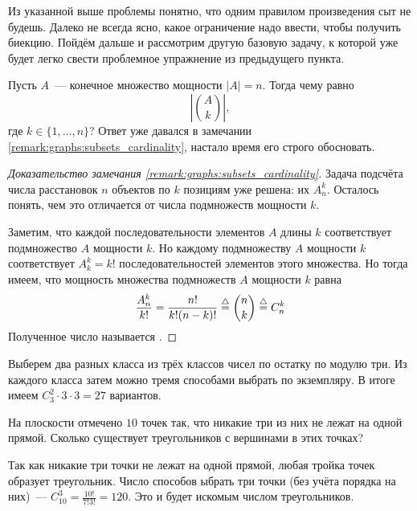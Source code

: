Из указанной выше проблемы понятно, что одним правилом произведения сыт не будешь.
Далеко не всегда ясно, какое ограничение надо ввести, чтобы получить биекцию.
Пойдём дальше и рассмотрим другую базовую задачу, к которой уже будет легко свести проблемное упражнение из предыдущего пункта.

Пусть $ A $~--- конечное множество мощности $ |A| = n $.
Тогда чему равно
\[
    \left| \binom{A}{k} \right|,
\]
где $ k \in \{1, \ldots, n\} $?
Ответ уже давался в замечании \ref{remark:graphs:subsets_cardinality}, настало время его строго обосновать.

\begin{proof}[Доказательство замечания \ref{remark:graphs:subsets_cardinality}]
    Задача подсчёта числа расстановок $ n $ объектов по $ k $ позициям уже решена:
    их $ A_n^k $.
    Осталось понять, чем это отличается от числа подмножеств мощности $ k $.

    Заметим, что каждой последовательности элементов $ A $ длины $ k $ соответствует подмножество $ A $ мощности $ k $.
    Но каждому подмножеству $ A $ мощности $ k $ соответствует $ A_k^k = k! $ последовательностей элементов этого множества.
    Но тогда имеем, что мощность множества подмножеств $ A $ мощности $ k $ равна
    \begin{equation}
        \label{eq:combinatorics:binomial}
        \frac{A_n^k}{k!} = \frac{n!}{k!(n-k)!} \overset{\triangle}{=} \binom{n}{k} \overset{\triangle}{=} C_n^k
    \end{equation}
    Полученное число называется .
\end{proof}

\vspace{\baselineskip}

\begin{Answer}
    \noindent
    Выберем два разных класса из трёх классов чисел по остатку по модулю три.
    Из каждого класса затем можно тремя способами выбрать по экземпляру.
    В итоге имеем $ C_3^2 \cdot 3 \cdot 3 = 27 $ вариантов.
\end{Answer}


\begin{Exercise}[counter=SecExercise, label={exercise:combinatorics:triangles}]
    \noindent
    На плоскости отмечено $ 10 $ точек так,
    что никакие три из них не лежат на одной прямой.
    Сколько существует треугольников с вершинами в этих точках?
\end{Exercise}

\begin{Answer}
    \noindent
    Так как никакие три точки не лежат на одной прямой,
    любая тройка точек образует треугольник.
    Число способов ыбрать три точки (без учёта порядка на них)~--- $ C_{10}^3 = \frac{10!}{7! 3!} = 120 $.
    Это и будет искомым числом треугольников.
\end{Answer}


